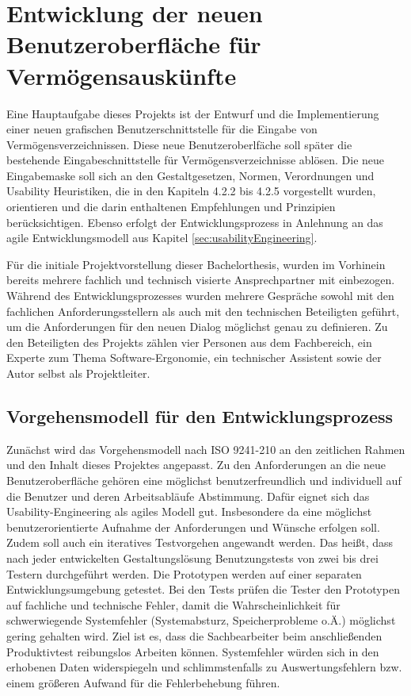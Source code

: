 \section{Entwicklung der neuen Benutzeroberfläche für Vermögensauskünfte}
Eine Hauptaufgabe dieses Projekts ist der Entwurf und die Implementierung einer neuen grafischen Benutzerschnittstelle für die Eingabe von Vermögensverzeichnissen. Diese neue Benutzeroberlfäche soll später die bestehende Eingabeschnittstelle für Vermögensverzeichnisse ablösen. Die neue Eingabemaske soll sich an den Gestaltgesetzen, Normen, Verordnungen und Usability Heuristiken, die in den Kapiteln 4.2.2 bis 4.2.5 vorgestellt wurden, orientieren und die darin enthaltenen Empfehlungen und Prinzipien berücksichtigen. Ebenso erfolgt der Entwicklungsprozess in Anlehnung an das agile Entwicklungsmodell aus Kapitel \ref{sec:usabilityEngineering}.

Für die initiale Projektvorstellung dieser Bachelorthesis, wurden im Vorhinein bereits mehrere fachlich und technisch visierte Ansprechpartner mit einbezogen. Während des Entwicklungsprozesses wurden mehrere Gespräche sowohl mit den fachlichen Anforderungsstellern als auch mit den technischen Beteiligten geführt, um die Anforderungen für den neuen Dialog möglichst genau zu definieren. Zu den Beteiligten des Projekts zählen vier Personen aus dem Fachbereich, ein Experte zum Thema Software-Ergonomie, ein technischer Assistent sowie der Autor selbst als Projektleiter.


\subsection{Vorgehensmodell für den Entwicklungsprozess}

Zunächst wird das Vorgehensmodell nach ISO 9241-210 an den zeitlichen Rahmen und den Inhalt dieses Projektes angepasst. Zu den Anforderungen an die neue Benutzeroberfläche gehören eine möglichst benutzerfreundlich und individuell auf die Benutzer und deren Arbeitsabläufe Abstimmung. Dafür eignet sich das Usability-Engineering als agiles Modell gut. Insbesondere da eine möglichst benutzerorientierte Aufnahme der Anforderungen und Wünsche erfolgen soll. Zudem soll auch ein iteratives Testvorgehen angewandt werden. Das heißt, dass nach jeder entwickelten Gestaltungslösung Benutzungstests von zwei bis drei Testern durchgeführt werden. Die Prototypen werden auf einer separaten Entwicklungsumgebung getestet. Bei den Tests prüfen die Tester den Prototypen auf fachliche und technische Fehler, damit die Wahrscheinlichkeit für schwerwiegende Systemfehler (Systemabsturz, Speicherprobleme o.Ä.) möglichst gering gehalten wird. Ziel ist es, dass die Sachbearbeiter beim anschließenden Produktivtest reibungslos Arbeiten können. Systemfehler würden sich in den erhobenen Daten widerspiegeln und schlimmstenfalls zu Auswertungsfehlern bzw. einem größeren Aufwand für die Fehlerbehebung führen.

